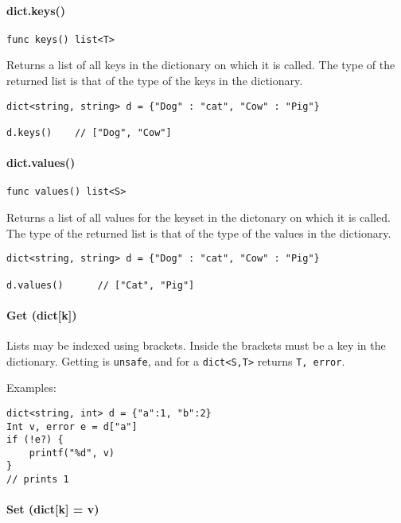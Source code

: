\documentclass[]{article}
\begin{document}
\paragraph{dict.keys()}\label{dict.keys}

\begin{verbatim}
func keys() list<T>
\end{verbatim}

Returns a list of all keys in the dictionary on which it is called. The
type of the returned list is that of the type of the keys in the
dictionary.

\begin{verbatim}
dict<string, string> d = {"Dog" : "cat", "Cow" : "Pig"}

d.keys()    // ["Dog", "Cow"]
\end{verbatim}

\paragraph{dict.values()}\label{dict.values}

\begin{verbatim}
func values() list<S>
\end{verbatim}

Returns a list of all values for the keyset in the dictonary on which it
is called. The type of the returned list is that of the type of the
values in the dictionary.

\begin{verbatim}
dict<string, string> d = {"Dog" : "cat", "Cow" : "Pig"}

d.values()      // ["Cat", "Pig"]
\end{verbatim}

\paragraph{Get (dict{[}k{]})}\label{get-dictk}

Lists may be indexed using brackets. Inside the brackets must be a key
in the dictionary. Getting is \texttt{unsafe}, and for a
\texttt{dict\textless{}S,T\textgreater{}} returns \texttt{T, error}.

Examples:

\begin{verbatim}
dict<string, int> d = {"a":1, "b":2}
Int v, error e = d["a"]
if (!e?) {
    printf("%d", v)
}
// prints 1
\end{verbatim}

\paragraph{Set (dict{[}k{]} = v)}\label{set-dictk-v}
\end{document}
